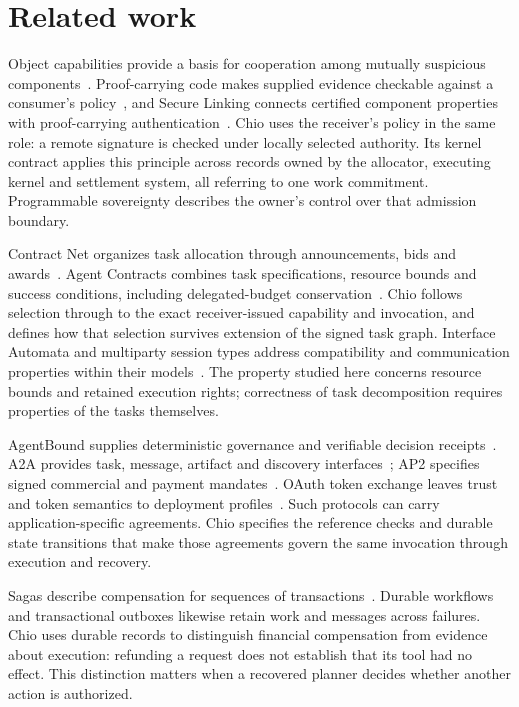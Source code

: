 \section{Related work}
\label{sec:related}
Object capabilities provide a basis for cooperation among mutually suspicious
components~\cite{miller}. Proof-carrying code makes supplied evidence checkable
against a consumer's policy~\cite{pcc}, and Secure Linking connects certified
component properties with proof-carrying authentication~\cite{securelink}.
Chio uses the receiver's policy in the same role: a remote signature is checked
under locally selected authority. Its kernel contract applies this principle
across records owned by the allocator, executing kernel and settlement system,
all referring to one work commitment. Programmable sovereignty describes the
owner's control over that admission boundary.

Contract Net organizes task allocation through announcements, bids and
awards~\cite{contractnet}. Agent Contracts combines task specifications,
resource bounds and success conditions, including delegated-budget
conservation~\cite{agentcontracts}. Chio follows selection through to the exact
receiver-issued capability and invocation, and defines how that selection
survives extension of the signed task graph. Interface Automata and multiparty
session types address compatibility and communication properties within their
models~\cite{interfaceautomata,sessiontypes}. The property studied here concerns
resource bounds and retained execution rights; correctness of task decomposition
requires properties of the tasks themselves.

AgentBound supplies deterministic governance and verifiable decision
receipts~\cite{agentbound}. A2A provides task, message, artifact and discovery
interfaces~\cite{a2a}; AP2 specifies signed commercial and payment
mandates~\cite{ap2}. OAuth token exchange leaves trust and token semantics to
deployment profiles~\cite{oauth}. Such protocols can carry application-specific
agreements. Chio specifies the reference checks and durable state transitions
that make those agreements govern the same invocation through execution and
recovery.

Sagas describe compensation for sequences of transactions~\cite{sagas}.
Durable workflows and transactional outboxes likewise retain work and messages
across failures. Chio uses durable records to distinguish financial compensation
from evidence about execution: refunding a request does not establish that its
tool had no effect. This distinction matters when a recovered planner decides
whether another action is authorized.


